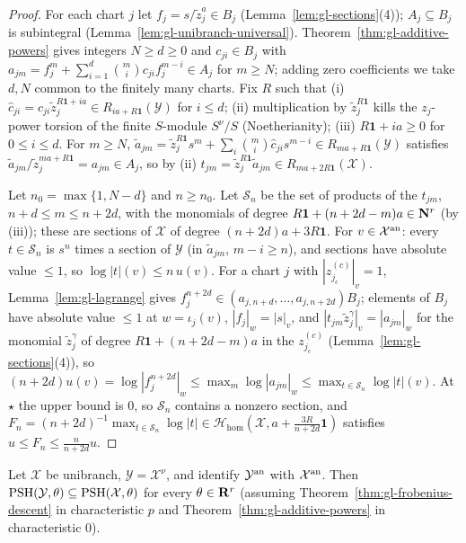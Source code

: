 \begin{proof}
For each chart $j$ let $f_j=s/\tilde z_j^a\in B_j$ (Lemma~\ref{lem:gl-sections}(4)); $A_j\subseteq B_j$ is subintegral (Lemma~\ref{lem:gl-unibranch-universal}).
Theorem~\ref{thm:gl-additive-powers} gives integers $N\ge d\ge0$ and $c_{ji}\in B_j$ with $a_{jm}=f_j^m+\sum_{i=1}^d\binom mic_{ji}f_j^{m-i}\in A_j$ for $m\ge N$;
adding zero coefficients we take $d,N$ common to the finitely many charts. Fix $R$ such that (i) $\hat c_{ji}=c_{ji}\tilde z_j^{R\mathbf1+ia}\in R_{ia+R\mathbf1}(\mathcal Y)$ for
$i\le d$; (ii) multiplication by $\tilde z_j^{R\mathbf1}$ kills the $z_j$-power torsion of the finite $S$-module $S^\nu/S$ (Noetherianity); (iii) $R\mathbf1+ia\ge0$ for
$0\le i\le d$. For $m\ge N$, $\tilde a_{jm}=\tilde z_j^{R\mathbf1}s^m+\sum_i\binom mi\hat c_{ji}s^{m-i}\in R_{ma+R\mathbf1}(\mathcal Y)$ satisfies
$\tilde a_{jm}/\tilde z_j^{ma+R\mathbf1}=a_{jm}\in A_j$, so by (ii) $t_{jm}=\tilde z_j^{R\mathbf1}\tilde a_{jm}\in R_{ma+2R\mathbf1}(\mathcal X)$.

Let $n_0=\max\{1,N-d\}$ and $n\ge n_0$. Let $\mathcal S_n$ be the set of products of the $t_{jm}$, $n+d\le m\le n+2d$, with the monomials of degree
$R\mathbf1+(n+2d-m)a\in\mathbf{N}^r$ (by (iii)); these are sections of $\mathcal X$ of degree $(n+2d)a+3R\mathbf1$. For $v\in\mathcal X^{\mathrm{an}}$: every $t\in\mathcal S_n$ is $s^n$
times a section of $\mathcal Y$ (in $\tilde a_{jm}$, $m-i\ge n$), and sections have absolute value $\le1$, so $\log|t|(v)\le n\,u(v)$. For a chart $j$ with
$|z^{(c)}_{j_c}|_v=1$, Lemma~\ref{lem:gl-lagrange} gives $f_j^{n+2d}\in(a_{j,n+d},\dots,a_{j,n+2d})B_j$; elements of $B_j$ have absolute value $\le1$ at $w=\iota_j(v)$, $|f_j|_w=|s|_v$, and
$|t_{jm}\tilde z_j^\gamma|_v=|a_{jm}|_w$ for the monomial $\tilde z_j^\gamma$ of degree $R\mathbf1+(n+2d-m)a$ in the $z^{(c)}_{j_c}$ (Lemma~\ref{lem:gl-sections}(4)), so $(n+2d)u(v)=\log|f_j^{n+2d}|_w\le\max_m\log|a_{jm}|_w\le\max_{t\in\mathcal S_n}\log|t|(v)$.
At $\star$ the upper bound is $0$, so $\mathcal S_n$ contains a nonzero section, and
$F_n=(n+2d)^{-1}\max_{t\in\mathcal S_n}\log|t|\in\mathcal H_{\mathrm{hom}}(\mathcal X,a+\frac{3R}{n+2d}\mathbf1)$ satisfies $u\le F_n\le\frac n{n+2d}u$.
\end{proof}

\begin{theorem}\label{thm:nn-normalization-reflection}
\leanok
{}
Let $\mathcal X$ be unibranch, $\mathcal Y=\mathcal X^\nu$, and identify $\mathcal Y^{\mathrm{an}}$ with $\mathcal X^{\mathrm{an}}$. Then $\operatorname{PSH}(\mathcal Y,\theta)\subseteq\operatorname{PSH}(\mathcal X,\theta)$
for every $\theta\in\mathbf{R}^r$ (assuming Theorem~\ref{thm:gl-frobenius-descent} in characteristic $p$ and Theorem~\ref{thm:gl-additive-powers} in characteristic $0$).
\end{theorem}

